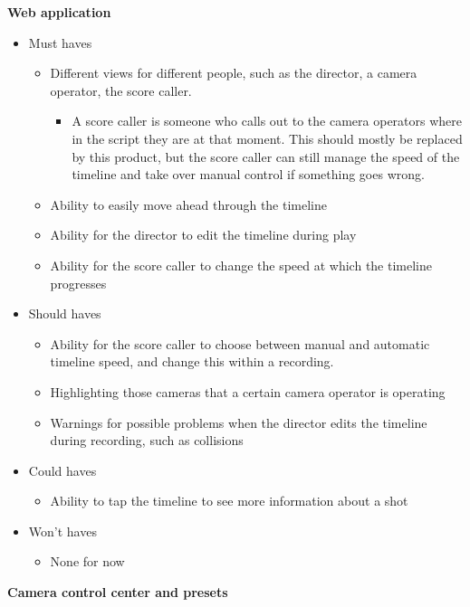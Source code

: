 \begin{large}
\textbf{Web application}
\end{large}
\begin{itemize}
\item Must haves
\begin{itemize}
\item Different views for different people, such as the director, a camera operator, the score caller.
\begin{itemize}
\item A score caller is someone who calls out to the camera operators where in the script they are at that moment. This should mostly be replaced by this product, but the score caller can still manage the speed of the timeline and take over manual control if something goes wrong.
\end{itemize}
\item Ability to easily move ahead through the timeline
\item Ability for the director to edit the timeline during play
\item Ability for the score caller to change the speed at which the timeline progresses
\end{itemize}
\item Should haves
\begin{itemize}
\item Ability for the score caller to choose between manual and automatic timeline speed, and change this within a recording.
\item Highlighting those cameras that a certain camera operator is operating
\item Warnings for possible problems when the director edits the timeline during recording, such as collisions
\end{itemize}
\item Could haves
\begin{itemize}
\item Ability to tap the timeline to see more information about a shot
\end{itemize}
\item Won't haves
\begin{itemize}
\item None for now
\end{itemize}
\end{itemize}
\begin{large}
\textbf{Camera control center and presets}
\end{large}
